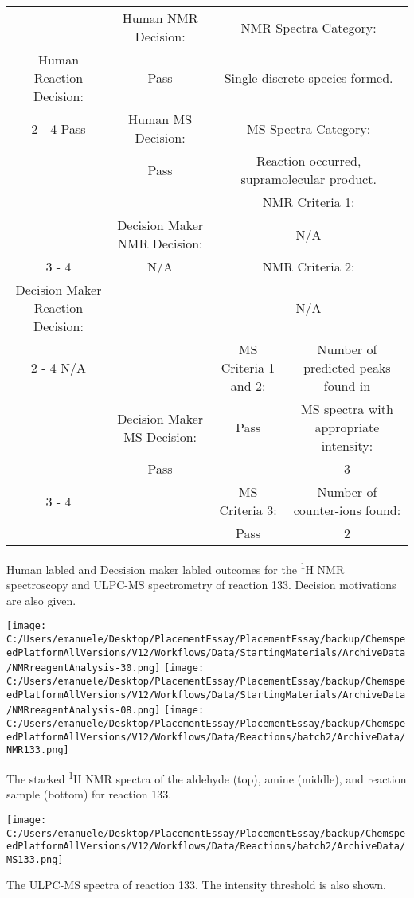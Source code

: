 \documentclass{article}%
\begin{document}
\begin{Decision Table}[H]%
\begin{tabular}{|c|c|c|c|}%
\hline%
&Human NMR Decision:&\multicolumn{2}{|c|}{NMR Spectra Category:}\\%
Human Reaction Decision:&Pass&\multicolumn{2}{|c|}{Single discrete species formed.}\\%
\cline{2%
-%
4}%
Pass&Human MS Decision:&\multicolumn{2}{|c|}{MS Spectra Category:}\\%
&Pass&\multicolumn{2}{|c|}{Reaction occurred, supramolecular product.}\\%
\hline%
&&\multicolumn{2}{|c|}{NMR Criteria 1:}\\%
&Decision Maker NMR Decision:&\multicolumn{2}{|c|}{N/A}\\%
\cline{3%
-%
4}%
&N/A&\multicolumn{2}{|c|}{NMR Criteria 2:}\\%
Decision Maker Reaction Decision:&&\multicolumn{2}{|c|}{N/A}\\%
\cline{2%
-%
4}%
N/A&&MS Criteria 1 and 2:&Number of predicted peaks found in\\%
&Decision Maker MS Decision:&Pass&MS spectra with appropriate intensity:\\%
&Pass&&3\\%
\cline{3%
-%
4}%
&&MS Criteria 3:&Number of counter{-}ions found:\\%
&&Pass&2\\%
\hline%
\end{tabular}%
\caption{Human labled and Decsision maker labled outcomes for the \textsuperscript{1}H NMR spectroscopy and ULPC-MS spectrometry of reaction 133. Decision motivations are also given.}%
\end{Decision Table}%
\begin{NMR Spectra}[H]%
\begin{center}%
\texttt{[image: C:/Users/emanuele/Desktop/PlacementEssay/PlacementEssay/backup/ChemspeedPlatformAllVersions/V12/Workflows/Data/StartingMaterials/ArchiveData/NMRreagentAnalysis-30.png]}\hfill%
\texttt{[image: C:/Users/emanuele/Desktop/PlacementEssay/PlacementEssay/backup/ChemspeedPlatformAllVersions/V12/Workflows/Data/StartingMaterials/ArchiveData/NMRreagentAnalysis-08.png]}\hfill%
\texttt{[image: C:/Users/emanuele/Desktop/PlacementEssay/PlacementEssay/backup/ChemspeedPlatformAllVersions/V12/Workflows/Data/Reactions/batch2/ArchiveData/NMR133.png]}\hfill%
\end{center}%
\caption{The stacked \textsuperscript{1}H NMR spectra of the aldehyde (top), amine (middle), and reaction sample (bottom) for reaction 133.}%
\end{NMR Spectra}%
\begin{MS Spectra}[H]%
\begin{center}%
\texttt{[image: C:/Users/emanuele/Desktop/PlacementEssay/PlacementEssay/backup/ChemspeedPlatformAllVersions/V12/Workflows/Data/Reactions/batch2/ArchiveData/MS133.png]}\hfill%
\end{center}%
\caption{The ULPC-MS spectra of reaction 133. The intensity threshold is also shown.}%
\end{MS Spectra}%
\end{document}
